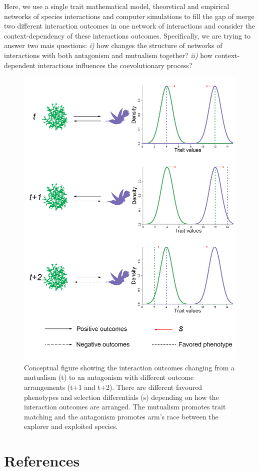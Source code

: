 \documentclass[a4paper, 12pt]{article}
\begin{document}
Here, we use a single trait mathematical model, theoretical and empirical networks of species interactions and computer simulations to fill the gap of merge two different interaction outcomes in one network of interactions and consider the context-dependency of these interactions outcomes. Specifically, we are trying to answer two mais questions: \textit{i)} how changes the structure of networks of interactions with both antagonism and mutualism together? \textit{ii)} how context-dependent interactions influences the coevolutionary process?

\begin{figure}
\linespread{1.0}

\includegraphics[width=\textwidth]{Fig1_ConDep.png}
\caption{Conceptual figure showing the interaction outcomes changing from a mutualism (t) to an antagonism with different outcome arrangements (t+1 and t+2). There are different favoured phenotypes and selection differentials (s) depending on how the interaction outcomes are arranged. The mutualism promotes trait matching and the antagonism promotes arm's race between the explorer and exploited species.}
\label{fig1}

\end{figure}

\nolinenumbers
\section{References}
\end{document}
